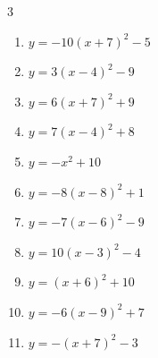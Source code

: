 \begin{multicols}{3}
\begin{enumerate}
        \phantom{$\displaystyle 頂点\left( 1 , -4 \right)$}

  \item $\displaystyle y=-10\left( x+7\right)^{2}-5$

        \phantom{$\displaystyle 頂点\left( -7 , -5 \right)$}

  \item $\displaystyle y=3\left( x-4\right)^{2}-9$

        \phantom{$\displaystyle 頂点\left( 4 , -9 \right)$}

  \item $\displaystyle y=6\left( x+7\right)^{2}+9$

        \phantom{$\displaystyle 頂点\left( -7 , 9 \right)$}

\columnbreak %

  \item $\displaystyle y=7\left( x-4\right)^{2}+8$

        \phantom{$\displaystyle 頂点\left( 4 , 8 \right)$}

  \item $\displaystyle y=-x^{2}+10$

        \phantom{$\displaystyle 頂点\left( 0 , 10 \right)$}

  \item $\displaystyle y=-8\left( x-8\right)^{2}+1$

        \phantom{$\displaystyle 頂点\left( 8 , 1 \right)$}

  \item $\displaystyle y=-7\left( x-6\right)^{2}-9$

        \phantom{$\displaystyle 頂点\left( 6 , -9 \right)$}

  \item $\displaystyle y=10\left( x-3\right)^{2}-4$

        \phantom{$\displaystyle 頂点\left( 3 , -4 \right)$}

  \item $\displaystyle y=\left( x+6\right)^{2}+10$

        \phantom{$\displaystyle 頂点\left( -6 , 10 \right)$}

  \item $\displaystyle y=-6\left( x-9\right)^{2}+7$

        \phantom{$\displaystyle 頂点\left( 9 , 7 \right)$}

  \item $\displaystyle y=-\left( x+7\right)^{2}-3$


\end{enumerate}
\end{multicols}
